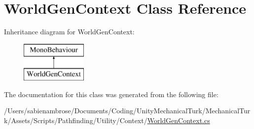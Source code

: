 \hypertarget{class_world_gen_context}{}\section{World\+Gen\+Context Class Reference}
\label{class_world_gen_context}
Inheritance diagram for World\+Gen\+Context\+:\begin{figure}[H]
\begin{center}
\leavevmode
\includegraphics[height=2.000000cm]{class_world_gen_context}
\end{center}
\end{figure}


The documentation for this class was generated from the following file\+:\begin{DoxyCompactItemize}
\item 
/\+Users/sabienambrose/\+Documents/\+Coding/\+Unity\+Mechanical\+Turk/\+Mechanical\+Turk/\+Assets/\+Scripts/\+Pathfinding/\+Utility/\+Context/\mbox{\hyperlink{_world_gen_context_8cs}{World\+Gen\+Context.\+cs}}\end{DoxyCompactItemize}
